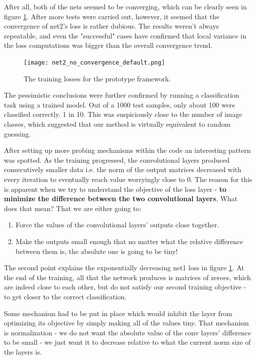 \documentclass[a4paper, 12pt]{article}
\numberwithin{equation}{section}
\begin{document}
	After all, both of the nets seemed to be converging, which can be clearly seen in figure \ref{fig:net2_no_convergence_default}. After more tests were carried out, however, it seemed that the convergence of net2's loss is rather dubious. The results weren't always repeatable, and even the "successful" cases have confirmed that local variance in the loss computations was bigger than the overall convergence trend.
	
	\begin{figure}[!h]
		\centering
		\texttt{[image: net2\_no\_convergence\_default.png]}
		\caption{\label{fig:net2_no_convergence_default}{The training losses for the prototype framework.}}
	\end{figure}
	
	The pessimistic conclusions were further confirmed by running a classification task using a trained model. Out of a 1000 test samples, only about 100 were classified correctly. 1 in 10. This was suspiciously close to the number of image classes, which suggested that our method is virtually equivalent to random guessing.
	
	After setting up more probing mechanisms within the code an interesting pattern was spotted. As the training progressed, the convolutional layers produced consecutively smaller data i.e. the norm of the output matrices decreased with every iteration to eventually reach value worryingly close to 0. The reason for this is apparent when we try to understand the objective of the loss layer - \textbf{to minimize the difference between the two convolutional layers}. What does that mean? That we are either going to:
	\begin{enumerate}
		\item Force the values of the convolutional layers' outputs close together.
		\item Make the outputs small enough that no matter what the relative difference between them is, the absolute one is going to be tiny!
	\end{enumerate} 
	
	The second point explains the exponentially decreasing net1 loss in figure \ref{fig:net2_no_convergence_default}. At the end of the training, all that the network produces is matrices of zeroes, which are indeed close to each other, but do not satisfy our second training objective - to get closer to the correct classification.
	
	Some mechanism had to be put in place which would inhibit the layer from optimizing its objective by simply making all of the values tiny. That mechanism is normalization - we do not want the absolute value of the conv layers' difference to be small - we just want it to decrease relative to what the current norm size of the layers is.
	
\end{document}
